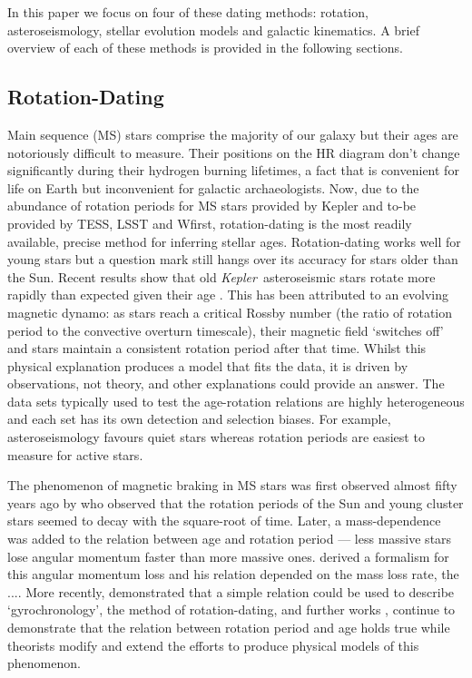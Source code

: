 \documentclass[useAMS, usenatbib, preprint, 12pt]{aastex}
\newcommand{\Kepler}{{\it Kepler}}
\newcommand{\kepler}{\Kepler}
\newcommand{\eg}{{\it e.g.}}
\begin{document}
In this paper we focus on four of these dating methods: rotation,
asteroseismology, stellar evolution models and galactic kinematics.
A brief overview of each of these methods is provided in the following
sections.

\subsection{Rotation-Dating}
\label{sec:rotation}

Main sequence (MS) stars comprise the majority of our galaxy but their ages
are notoriously difficult to measure.
Their positions on the HR diagram don't change significantly during their
    hydrogen burning lifetimes, a fact that is convenient for life on Earth
    but inconvenient for galactic archaeologists.
Now, due to the abundance of rotation periods for MS stars provided by Kepler
    and to-be provided by TESS, LSST and Wfirst, rotation-dating is the most
    readily available, precise method for inferring stellar ages.
Rotation-dating works well for young stars but a question mark still hangs
    over its accuracy for stars older than the Sun.
Recent results show that old \kepler\ asteroseismic stars rotate more rapidly
    than expected given their age \citep[\eg][]{Angus2015, Vansaders2016,
    Metcalfe2016}.
This has been attributed to an evolving magnetic dynamo: as stars reach a
    critical Rossby number (the ratio of rotation period to the convective
    overturn timescale), their magnetic field `switches off' and stars
    maintain a consistent rotation period after that time.
Whilst this physical explanation produces a model that fits the data, it
    is driven by observations, not theory, and other explanations could
    provide an answer.
The data sets typically used to test the age-rotation relations are highly
    heterogeneous and each set has its own detection and selection biases.
For example, asteroseismology favours quiet stars whereas rotation periods are
    easiest to measure for active stars.

The phenomenon of magnetic braking in MS stars was first observed almost fifty
years ago by \citet{Skumanich1972} who observed that the rotation periods of
the Sun and young cluster stars seemed to decay with the square-root of time.
Later, a mass-dependence was added to the relation between age and rotation
period --- less massive stars lose angular momentum faster than more massive
ones.
\citet{Kawaler1988} derived a formalism for this angular momentum loss and his
relation depended on the mass loss rate, the ....
More recently, \citet{Barnes2003} demonstrated that a simple relation could be
used to describe `gyrochronology', the method of rotation-dating, and further
works \citep[\eg][]{Barnes2007, Mamajek2008, Barnes2010, Meibom2011},
continue to demonstrate that the relation between rotation period and age
holds true while theorists \citep[\eg][]{Matt2012, Epstein2014} modify and
extend the efforts to produce physical models of this phenomenon.
\end{document}
